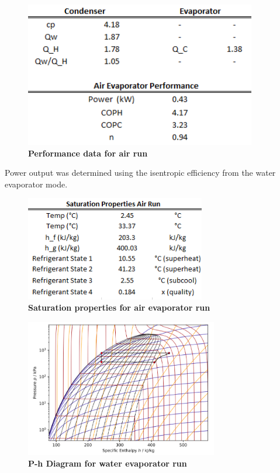 \documentclass{article}
\begin{document}
\begin{figure} [H]
	\centering
	\includegraphics[width=0.9\textwidth]{air_performance}
	\caption{\textbf{Performance data for air run}}
\end{figure}
Power output was determined using the isentropic efficiency from the water evaporator mode. 

\begin{figure} [H]
	\centering
	\includegraphics[width=0.70\textwidth]{A_saturation}
	\caption{\textbf{Saturation properties for air evaporator run}}
\end{figure}

\begin{figure} [H]
	\centering
	\includegraphics[width=0.75\textwidth]{ph_air}
	\caption{\textbf{P-h Diagram for water evaporator run}}
\end{figure}
\end{document}
